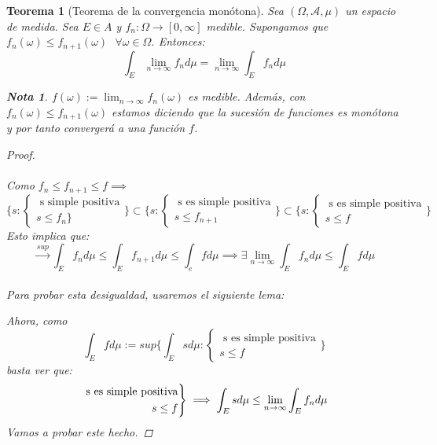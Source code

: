 \documentclass[11pt, a4paper]{article}
\theoremstyle{theorem-style}
\newtheorem{nth}{Teorema}[section]
\theoremstyle{definition-style}
\theoremstyle{remark-style}
\newtheorem*{nota}{Nota}
\theoremstyle{example-style}
\newenvironment{rcases}
  {\left.\begin{aligned}}
  {\end{aligned}\right\rbrace}
\begin{document}
\begin{nth}[Teorema de la convergencia monótona]
	Sea $(\Omega,\mathcal{A},\mu)$ un espacio de medida. Sea $E\in A$ y $f_n: \Omega \to [0,\infty]$ medible. Supongamos que $f_n(\omega) \leq f_{n+1}(\omega) \ \ \ \forall \omega \in \Omega$. Entonces:
	\[
\int_E \lim_{n \to \infty} f_n d\mu = \lim_{n \to \infty}\int_E f_n d \mu
	\]
	\begin{nota}
	 $f(\omega):= \lim _{n\to \infty} f_n(\omega)$ es medible. Además, con $f_n(\omega) \leq f_{n+1}(\omega)$ estamos diciendo que la sucesión de funciones es monótona y por tanto convergerá a una función $f$.
\end{nota}

\begin{proof}\hfill\\
\boxed{\leq}\hfill\\
Como $f_n \leq f_{n+1} \leq f \implies$
\[
\{ s  : \begin{cases} \text{ s simple positiva}\\ s \leq f_n \}
	
\end{cases}\}  \subset \{ s: \begin{cases} \text{ s es simple positiva}\\
s\leq f_{n+1}
	
\end{cases} \} \subset \{s: \begin{cases}\text{ s es simple positiva}\\ s \leq f
	
\end{cases}\}
\]
Esto implica que:
\[
\xrightarrow{sup} \int_E f_n d \mu \leq \int_E f_{n+1} d\mu \leq \int_e f d \mu \implies \exists \lim_{n\to \infty} \int_E f_n d\mu \leq \int_E f d \mu
\]
\boxed{\geq}\hfill \\
Para probar esta desigualdad, usaremos el siguiente lema: 

Ahora, como
\[
\int_E f d \mu:= sup \{\int_E s d\mu : \begin{cases} \text{ s es simple positiva}\\
s \leq f
	
\end{cases}\}
\]
basta ver que:
\[
\begin{rcases}
	\text{ s es simple positiva}\\
	s \leq f
\end{rcases} \implies \int_E s d\mu \leq \lim_{n\to \infty} \int_E f_n d\mu
\]
Vamos a probar este hecho.


\end{proof}
\end{nth}
\end{document}
